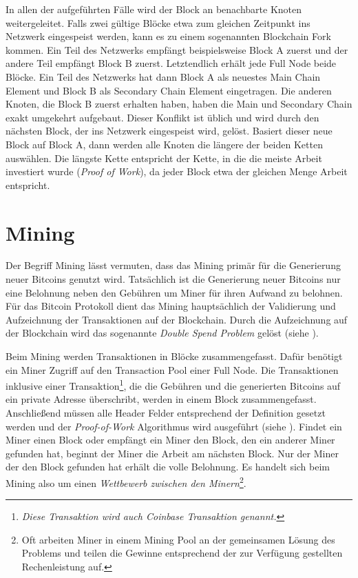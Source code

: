 \documentclass[ngerman,runningheads,a4paper]{llncs}[2018/03/10]
\begin{document}
In allen der aufgeführten Fälle wird der Block an benachbarte Knoten weitergeleitet. Falls zwei gültige Blöcke etwa zum gleichen Zeitpunkt ins Netzwerk eingespeist werden, kann es zu einem sogenannten Blockchain Fork kommen. Ein Teil des Netzwerks empfängt beispielsweise Block A zuerst und der andere Teil empfängt Block B zuerst. Letztendlich erhält jede Full Node beide Blöcke. Ein Teil des Netzwerks hat dann Block A als neuestes Main Chain Element und Block B als Secondary Chain Element eingetragen. Die anderen Knoten, die Block B zuerst erhalten haben, haben die Main und Secondary Chain exakt umgekehrt aufgebaut. Dieser Konflikt ist üblich und wird durch den nächsten Block, der ins Netzwerk eingespeist wird, gelöst. Basiert dieser neue Block auf Block A, dann werden alle Knoten die längere der beiden Ketten auswählen. Die längste Kette entspricht der Kette, in die die meiste Arbeit investiert wurde (\textit{Proof of Work}), da jeder Block etwa der gleichen Menge Arbeit entspricht.

\section{Mining}\label{sec:mining}

Der Begriff Mining lässt vermuten, dass das Mining primär für die Generierung neuer Bitcoins genutzt wird. Tatsächlich ist die Generierung neuer Bitcoins nur eine Belohnung neben den Gebühren um Miner für ihren Aufwand zu belohnen. Für das Bitcoin Protokoll dient das Mining hauptsächlich der Validierung und Aufzeichnung der Transaktionen auf der Blockchain. Durch die Aufzeichnung auf der Blockchain wird das sogenannte \textit{Double Spend Problem} gelöst (siehe ).  

Beim Mining werden Transaktionen in Blöcke zusammengefasst. Dafür benötigt ein Miner Zugriff auf den Transaction Pool einer Full Node. Die Transaktionen inklusive einer Transaktion\footnote{\textit{Diese Transaktion wird auch \textit{Coinbase Transaktion} genannt.}}, die die Gebühren und die generierten Bitcoins auf ein private Adresse überschribt, werden in einem Block zusammengefasst. Anschließend müssen alle Header Felder entsprechend der Definition gesetzt werden und der \textit{Proof-of-Work} Algorithmus wird ausgeführt (siehe ). Findet ein Miner einen Block oder empfängt ein Miner den Block, den ein anderer Miner gefunden hat, beginnt der Miner die Arbeit am nächsten Block. Nur der Miner der den Block gefunden hat erhält die volle Belohnung. Es handelt sich beim Mining also um einen \textit{Wettbewerb zwischen den Minern}\footnote{Oft arbeiten Miner in einem Mining Pool an der gemeinsamen Lösung des Problems und teilen die Gewinne entsprechend der zur Verfügung gestellten Rechenleistung auf.}.
\end{document}
